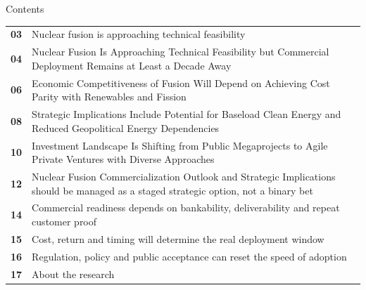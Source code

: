 \documentclass[10pt,a4paper]{article}
\begin{document}
\clearpage
{\sffamily\fontsize{26}{31}\selectfont\color{BONavy} Contents}\par\vspace{10pt}
\begin{tabularx}{\linewidth}{p{14mm}Y}
\textcolor{BOGreen}{\bfseries 03} & Nuclear fusion is approaching technical feasibility \\[5pt]
\textcolor{BOGreen}{\bfseries 04} & Nuclear Fusion Is Approaching Technical Feasibility but Commercial Deployment Remains at Least a Decade Away \\[5pt]
\textcolor{BOGreen}{\bfseries 06} & Economic Competitiveness of Fusion Will Depend on Achieving Cost Parity with Renewables and Fission \\[5pt]
\textcolor{BOGreen}{\bfseries 08} & Strategic Implications Include Potential for Baseload Clean Energy and Reduced Geopolitical Energy Dependencies \\[5pt]
\textcolor{BOGreen}{\bfseries 10} & Investment Landscape Is Shifting from Public Megaprojects to Agile Private Ventures with Diverse Approaches \\[5pt]
\textcolor{BOGreen}{\bfseries 12} & Nuclear Fusion Commercialization Outlook and Strategic Implications should be managed as a staged strategic option, not a binary bet \\[5pt]
\textcolor{BOGreen}{\bfseries 14} & Commercial readiness depends on bankability, deliverability and repeat customer proof \\[5pt]
\textcolor{BOGreen}{\bfseries 15} & Cost, return and timing will determine the real deployment window \\[5pt]
\textcolor{BOGreen}{\bfseries 16} & Regulation, policy and public acceptance can reset the speed of adoption \\[5pt]
\textcolor{BOGreen}{\bfseries 17} & About the research \\[5pt]
\end{tabularx}
\clearpage
\end{document}
